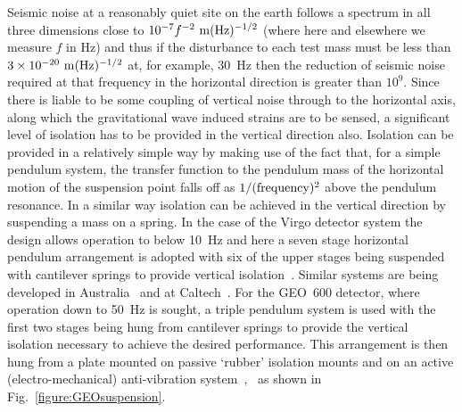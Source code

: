 \documentclass{article}
\begin{document}
Seismic noise at a reasonably quiet site on the earth follows a
spectrum in all three dimensions close to $10^{-7}f^{-2} {\rm \ m}(\rm
Hz)^{-1/2}$ (where here and elsewhere we measure $f$ in Hz) and thus
if the disturbance to each test mass must be less than $3 \times
10^{-20} {\rm \ m}(\rm Hz)^{-1/2}$ at, for example, 30~Hz then the
reduction of seismic noise required at that frequency in the
horizontal direction is greater than $10^{9}$. Since there is liable
to be some coupling of vertical noise through to the horizontal axis,
along which the gravitational wave induced strains are to be sensed, a
significant level of isolation has to be provided in the vertical
direction also. Isolation can be provided in a relatively simple way
by making use of the fact that, for a simple pendulum system, the
transfer function to the pendulum mass of the horizontal motion of the
suspension point falls off as $1/({\rm frequency})^2$ above the
pendulum resonance. In a similar way isolation can be achieved in the
vertical direction by suspending a mass on a spring. In the case of
the Virgo detector system the design allows operation to below 10~Hz
and here a seven stage horizontal pendulum arrangement is adopted with
six of the upper stages being suspended with cantilever springs to
provide vertical isolation~\cite{Braccini}. Similar systems are being
developed in Australia~\cite{Ju1} and at Caltech~\cite{DeSalvo}. For
the GEO~600 detector, where operation down to 50~Hz is sought, a
triple pendulum system is used with the first two stages being hung
from cantilever springs to provide the vertical isolation necessary to
achieve the desired performance. This arrangement is then hung from a
plate mounted on passive `rubber' isolation mounts and on an active
(electro-mechanical) anti-vibration
system~\cite{Plissi1},~\cite{Torrie} as shown in
Fig.~\ref{figure:GEOsuspension}. 
\end{document}
